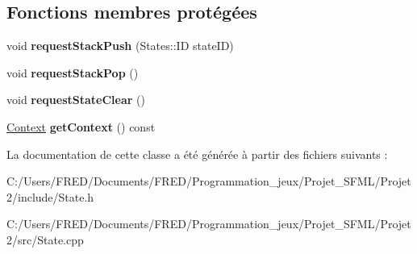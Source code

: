\subsection*{Fonctions membres protégées}
\begin{DoxyCompactItemize}
\item 
void {\bfseries request\+Stack\+Push} (States\+::\+ID state\+ID)\hypertarget{class_state_a6763de833ceb9c23df45aff163a4a1cd}{}\label{class_state_a6763de833ceb9c23df45aff163a4a1cd}

\item 
void {\bfseries request\+Stack\+Pop} ()\hypertarget{class_state_aa418660892d6161772c907bd8d70f910}{}\label{class_state_aa418660892d6161772c907bd8d70f910}

\item 
void {\bfseries request\+State\+Clear} ()\hypertarget{class_state_a4b602bed9bf0179ee5f6748fce340ae6}{}\label{class_state_a4b602bed9bf0179ee5f6748fce340ae6}

\item 
\hyperlink{struct_state_1_1_context}{Context} {\bfseries get\+Context} () const \hypertarget{class_state_aa54fc68acd982076e838c0eff60b51a3}{}\label{class_state_aa54fc68acd982076e838c0eff60b51a3}

\end{DoxyCompactItemize}


La documentation de cette classe a été générée à partir des fichiers suivants \+:\begin{DoxyCompactItemize}
\item 
C\+:/\+Users/\+F\+R\+E\+D/\+Documents/\+F\+R\+E\+D/\+Programmation\+\_\+jeux/\+Projet\+\_\+\+S\+F\+M\+L/\+Projet2/include/State.\+h\item 
C\+:/\+Users/\+F\+R\+E\+D/\+Documents/\+F\+R\+E\+D/\+Programmation\+\_\+jeux/\+Projet\+\_\+\+S\+F\+M\+L/\+Projet2/src/State.\+cpp\end{DoxyCompactItemize}
